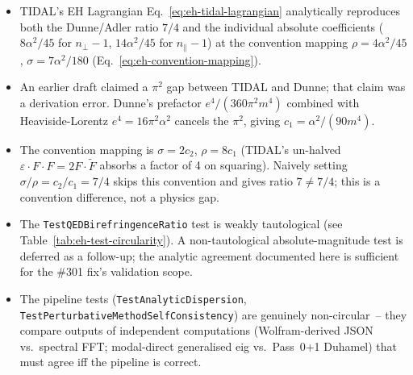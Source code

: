 \begin{itemize}
  \item TIDAL's EH Lagrangian Eq.~\eqref{eq:eh-tidal-lagrangian} analytically reproduces both the Dunne/Adler ratio $7/4$ and the individual absolute coefficients ($8\alpha^2/45$ for $n_\perp - 1$, $14\alpha^2/45$ for $n_\parallel - 1$) at the convention mapping $\rho = 4\alpha^2/45$, $\sigma = 7\alpha^2/180$ (Eq.~\eqref{eq:eh-convention-mapping}).
  \item An earlier draft claimed a $\pi^2$ gap between TIDAL and Dunne; that claim was a derivation error. Dunne's prefactor $e^4/(360\pi^2 m^4)$ combined with Heaviside-Lorentz $e^4 = 16\pi^2\alpha^2$ cancels the $\pi^2$, giving $c_1 = \alpha^2/(90 m^4)$.
  \item The convention mapping is $\sigma = 2c_2$, $\rho = 8c_1$ (TIDAL's un-halved $\varepsilon\cdot F\cdot F = 2 F\cdot\tilde{F}$ absorbs a factor of 4 on squaring). Naively setting $\sigma/\rho = c_2/c_1 = 7/4$ skips this convention and gives ratio $7 \neq 7/4$; this is a convention difference, not a physics gap.
  \item The \texttt{TestQEDBirefringenceRatio} test is weakly tautological (see Table~\ref{tab:eh-test-circularity}). A non-tautological absolute-magnitude test is deferred as a follow-up; the analytic agreement documented here is sufficient for the \#301 fix's validation scope.
  \item The pipeline tests (\texttt{TestAnalyticDispersion}, \texttt{TestPerturbativeMethodSelfConsistency}) are genuinely non-circular~-- they compare outputs of independent computations (Wolfram-derived JSON vs.\ spectral FFT; modal-direct generalised eig vs.\ Pass~0+1 Duhamel) that must agree iff the pipeline is correct.
\end{itemize}
